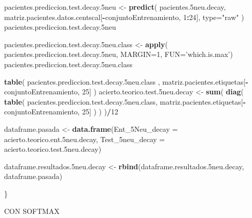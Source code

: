\documentclass[]{article}
\newenvironment{Shaded}{\begin{snugshade}}{\end{snugshade}}
\newcommand{\KeywordTok}[1]{\textcolor[rgb]{0.13,0.29,0.53}{\textbf{#1}}}
\newcommand{\DataTypeTok}[1]{\textcolor[rgb]{0.13,0.29,0.53}{#1}}
\newcommand{\DecValTok}[1]{\textcolor[rgb]{0.00,0.00,0.81}{#1}}
\newcommand{\StringTok}[1]{\textcolor[rgb]{0.31,0.60,0.02}{#1}}
\newcommand{\OperatorTok}[1]{\textcolor[rgb]{0.81,0.36,0.00}{\textbf{#1}}}
\newcommand{\NormalTok}[1]{#1}
\begin{document}
\begin{Shaded}
\begin{Highlighting}[]
\NormalTok{  pacientes.prediccion.test.decay.5neu <-}\StringTok{ }\KeywordTok{predict}\NormalTok{( pacientes.5neu.decay, matriz.pacientes.datos.centscal[}\OperatorTok{-}\NormalTok{conjuntoEntrenamiento, }\DecValTok{1}\OperatorTok{:}\DecValTok{24}\NormalTok{], }\DataTypeTok{type=}\StringTok{"raw"}\NormalTok{ )}
\NormalTok{  pacientes.prediccion.test.decay.5neu}
  
\NormalTok{  pacientes.prediccion.test.decay.5neu.class <-}\StringTok{ }\KeywordTok{apply}\NormalTok{( pacientes.prediccion.test.decay.5neu, }\DataTypeTok{MARGIN=}\DecValTok{1}\NormalTok{, }\DataTypeTok{FUN=}\StringTok{'which.is.max'}\NormalTok{)}
\NormalTok{  pacientes.prediccion.test.decay.5neu.class}
  
  \KeywordTok{table}\NormalTok{( pacientes.prediccion.test.decay.5neu.class , matriz.pacientes.etiquetas[}\OperatorTok{-}\NormalTok{conjuntoEntrenamiento, }\DecValTok{25}\NormalTok{] )}
\NormalTok{  acierto.teorico.test.5neu.decay <-}\StringTok{ }\KeywordTok{sum}\NormalTok{( }\KeywordTok{diag}\NormalTok{( }\KeywordTok{table}\NormalTok{( pacientes.prediccion.test.decay.5neu.class, matriz.pacientes.etiquetas[}\OperatorTok{-}\NormalTok{conjuntoEntrenamiento, }\DecValTok{25}\NormalTok{] ) ) )}\OperatorTok{/}\DecValTok{12}
  
  
\NormalTok{  dataframe.pasada <-}\StringTok{ }\KeywordTok{data.frame}\NormalTok{(}\DataTypeTok{Ent_5Neu_decay =}\NormalTok{ acierto.teorico.ent.5neu.decay,}
                                 \DataTypeTok{Test_5neu_decay =}\NormalTok{ acierto.teorico.test.5neu.decay)}
  
\NormalTok{  dataframe.resultados.5neu.decay <-}\StringTok{ }\KeywordTok{rbind}\NormalTok{(dataframe.resultados.5neu.decay, dataframe.pasada)}
  
\NormalTok{\}}
\end{Highlighting}
\end{Shaded}

CON SOFTMAX
\end{document}
